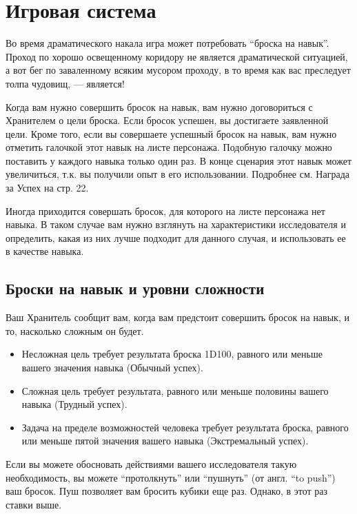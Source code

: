 \documentclass[letterpaper,twocolumn,openany, twoside, 11pt, usenames]{cocbook}
\begin{document}
\section*{Игровая система}

Во время драматического накала игра может потребовать ``броска на навык''. Проход по хорошо освещенному коридору не является драматической ситуацией, а вот бег по заваленному всяким мусором проходу, в то время как вас преследует толпа чудовищ, --- является!

Когда вам нужно совершить бросок на навык, вам нужно договориться с Хранителем о цели броска. Если бросок успешен, вы достигаете заявленной цели. Кроме того, если вы совершаете успешный бросок на навык, вам нужно отметить галочкой этот навык на листе персонажа. Подобную галочку можно поставить у каждого навыка только один раз. В конце сценария этот навык может увеличиться, т.к. вы получили опыт в его использовании. Подробнее см. Награда за Успех на стр. 22.

Иногда приходится совершать бросок, для которого на листе персонажа нет навыка. В таком случае вам нужно взглянуть на характеристики исследователя и определить, какая из них лучше подходит для данного случая, и использовать ее в качестве навыка.

\subsection*{Броски на навык и уровни сложности}

Ваш Хранитель сообщит вам, когда вам предстоит совершить бросок на навык, и то, насколько сложным он будет.
\smallbreak
\begin{itemize}[leftmargin=4mm]
  \item Несложная цель требует результата броска 1D100, равного или меньше вашего значения навыка (Обычный успех).
  \item Сложная цель требует результата, равного или меньше половины вашего навыка (Трудный успех).
  \item Задача на пределе возможностей человека требует результата броска, равного или меньше пятой значения вашего навыка (Экстремальный успех).
\end{itemize}
\smallbreak
Если вы можете обосновать действиями вашего исследователя такую необходимость, вы можете ``протолкнуть'' или ``пушнуть'' (от англ. ``to push'') ваш бросок. Пуш позволяет вам бросить кубики еще раз. Однако, в этот раз ставки выше.
\end{document}
